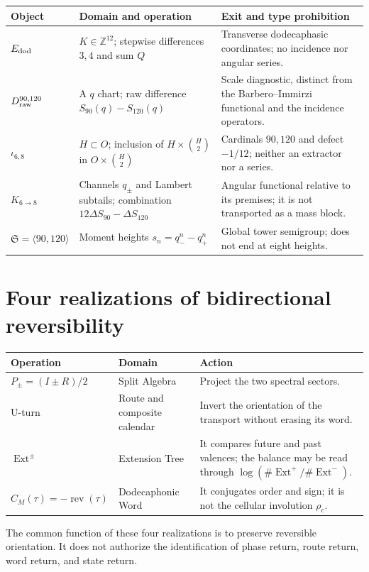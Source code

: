 \begin{longtable}{@{}
>{\raggedright\arraybackslash}p{}
>{\raggedright\arraybackslash}p{}
>{\raggedright\arraybackslash}p{}@{}}
\toprule
Object & Domain and operation & Exit and type prohibition \\ \midrule
\endhead
\(\mathcal E_{\rm dod}\)&\(K\in\mathbb Z^{12}\); stepwise differences
\(3,4\) and sum \(Q\)&Transverse dodecaphasic coordinates; no incidence
nor angular series.\\
\(D_{\rm raw}^{90,120}\)&A \(q\) chart; raw difference
\(S_{90}(q)-S_{120}(q)\)&Scale diagnostic, distinct from the
Barbero--Immirzi functional and the incidence operators.\\
\(\iota_{6,8}\)&\(H\subset O\); inclusion of
\(H\times\binom{H}{2}\) in \(O\times\binom{H}{2}\)&Cardinals \(90,120\) and
defect \(-1/12\); neither an extractor nor a series.\\
\(K_{6\to8}\)&Channels \(q_\pm\) and Lambert subtails; combination
\(12\Delta S_{90}-\Delta S_{120}\)&Angular functional relative to its
premises; it is not transported as a mass block.\\
\(\mathfrak S=\langle90,120\rangle\)&Moment heights
\(s_n=q_-^n-q_+^n\)&Global tower semigroup; does not end at eight heights.\\
\bottomrule
\end{longtable}

\section*{Four realizations of bidirectional reversibility}

\begin{longtable}{@{}
  >{\raggedright\arraybackslash}p{}
  >{\raggedright\arraybackslash}p{}
  >{\raggedright\arraybackslash}p{}@{}}
\toprule
Operation & Domain & Action \\ \midrule
\endhead
\(P_\pm=(I\pm R)/2\)&Split Algebra&Project the two spectral sectors.\\
U-turn&Route and composite calendar&Invert the orientation of the
transport without erasing its word.\\
\(\operatorname{Ext}^{\pm}\)&Extension Tree&It compares future
and past valences; the balance may be read through
\(\log(\#\operatorname{Ext}^+/\#\operatorname{Ext}^-)\).\\
\(C_M(\tau)=-\operatorname{rev}(\tau)\)&Dodecaphonic Word&It conjugates order
and sign; it is not the cellular involution \(\rho_c\).\\
\bottomrule
\end{longtable}

The common function of these four realizations is to preserve reversible
orientation. It does not authorize the identification of phase return, route
return, word return, and state return.
